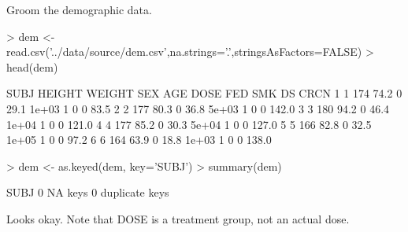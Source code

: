 Groom the demographic data.
\begin{Schunk}
\begin{Sinput}
> dem  <- read.csv('../data/source/dem.csv',na.strings='.',stringsAsFactors=FALSE)
> head(dem)
\end{Sinput}
\begin{Soutput}
  SUBJ HEIGHT WEIGHT SEX  AGE  DOSE FED SMK DS  CRCN
1    1    174   74.2   0 29.1 1e+03   1   0  0  83.5
2    2    177   80.3   0 36.8 5e+03   1   0  0 142.0
3    3    180   94.2   0 46.4 1e+04   1   0  0 121.0
4    4    177   85.2   0 30.3 5e+04   1   0  0 127.0
5    5    166   82.8   0 32.5 1e+05   1   0  0  97.2
6    6    164   63.9   0 18.8 1e+03   1   0  0 138.0
\end{Soutput}
\begin{Sinput}
> dem <- as.keyed(dem, key='SUBJ')
> summary(dem)
\end{Sinput}
\begin{Soutput}
SUBJ
0 NA keys
0 duplicate keys
\end{Soutput}
\end{Schunk}
Looks okay.  Note that DOSE is a treatment group, not an actual dose.

